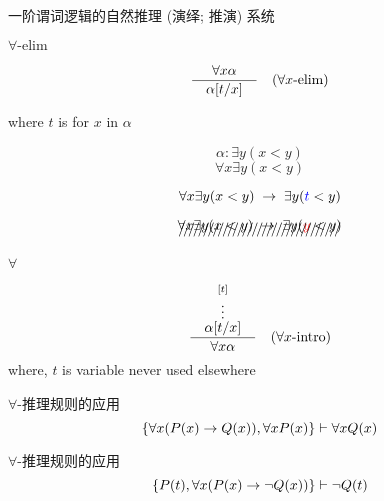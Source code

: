 
\begin{frame}{}
  \begin{center}
    {\Large 一阶谓词逻辑的自然推理 (演绎; 推演) 系统}
  \end{center}
\end{frame}

\begin{frame}{$\forall\text{-elim}$}
  \begin{center}
    \[
      \frac{\quad\forall x \alpha\quad}{\quad\alpha[t/x]\quad} \quad (\forall x\text{-elim})
    \]

    where $t$ is  for $x$ in $\alpha$
  \end{center}

  \pause
  \[
    \alpha: \exists y (x < y)
  \]
  \[
    \forall x \exists y (x < y)
  \]

  \pause
  \[
    \forall x \exists y (x < y) \;\to\; \exists y (\textcolor{blue}{t} < y)
  \]

  \pause
  \[
    \xout{\forall x \exists y (x < y) \;\to\; \exists y (\red{y} < y)}
  \]
\end{frame}

\begin{frame}{$\forall$}
  \begin{center}
    \[
      \frac{\quad\stackrel{[t]}{\stackrel{\vdots}{\alpha[t/x]}}\quad}{\quad\forall x \alpha\quad} \quad (\forall x\text{-intro})
    \]
    where, $t$ is  variable never used elsewhere
  \end{center}
\end{frame}

\begin{frame}{}
  \begin{exampleblock}{$\forall$-推理规则的应用}
    \[
      \{\forall x (P(x) \to Q(x)), \forall x P(x)\} \vdash \forall x Q(x)
    \]
  \end{exampleblock}
\end{frame}

\begin{frame}{}
  \begin{exampleblock}{$\forall$-推理规则的应用}
    \[
      \{P(t), \forall x (P(x) \to \lnot Q(x))\} \vdash \lnot Q(t)
    \]
  \end{exampleblock}
\end{frame}

